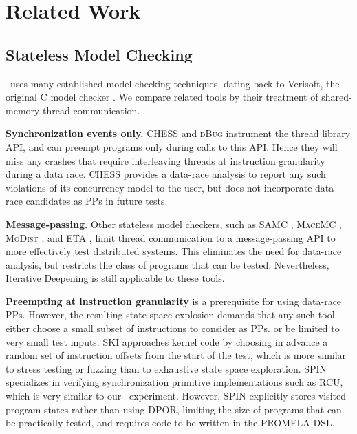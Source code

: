 \section{Related Work}


\subsection{Stateless Model Checking}

\landslide~uses many established model-checking techniques, dating back
to Verisoft, the original C model checker \cite{verisoft}.
We compare related tools by their treatment of shared-memory thread communication.

{\bf Synchronization events only.} CHESS \cite{chess} and \textsc{dBug} \cite{dbug-ssv} instrument the thread library API, and can preempt programs only during calls to this API.
Hence they will miss any crashes that require interleaving threads at instruction granularity during a data race. CHESS provides a data-race analysis to report any such violations of its concurrency model to the user, but does not incorporate data-race candidates as PPs in future tests.

{\bf Message-passing.} Other stateless model checkers, such as SAMC \cite{samc}, \textsc{MaceMC} \cite{macemc}, \textsc{MoDist} \cite{modist}, and ETA \cite{dbug-retreat}, limit thread communication to a message-passing API to more effectively test distributed systems.
This eliminates the need for data-race analysis, but restricts the class of programs that can be tested.
Nevertheless, Iterative Deepening is still applicable to these tools.

{\bf Preempting at instruction granularity} is a prerequisite for using data-race PPs.
However, the resulting state space explosion demands that any such tool either
choose a small subset of instructions to consider as PPs.
or be limited to very small test inputs.
{\textsc SKI} \cite{ski} approaches kernel code by choosing in advance a random set of instruction offsets from the start of the test,
which is more similar to stress testing or fuzzing than to exhaustive state space exploration.
SPIN \cite{spin} specializes in verifying synchronization primitive implementations such as RCU, which is very similar to our \mxtest~experiment.
However, SPIN explicitly stores visited program states rather than using DPOR, limiting the size of programs that can be practically tested,
and requires code to be written in the PROMELA DSL.

